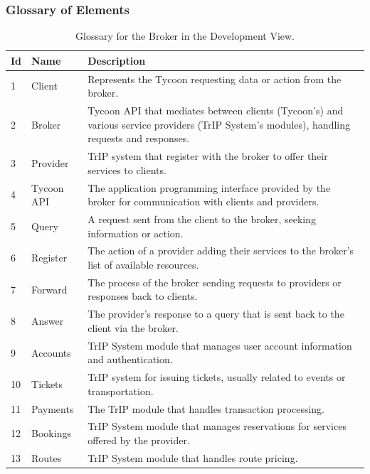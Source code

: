\subsubsection{Glossary of Elements}

\begin{table}[H]
    \centering
    \caption{Glossary for the Broker in the Development View.}
    \label{tab:broker_development_glossary}
    \begin{tabular}{@{}llp{10cm}@{}}
        \toprule
    \textbf{Id} & \textbf{Name} & \textbf{Description} \\
    \midrule
    1 & Client & Represents the Tycoon requesting data or action from the broker. \\
    2 & Broker & Tycoon API that mediates between clients (Tycoon's) and various service providers (TrIP System's modules), handling requests and responses. \\
    3 & Provider & TrIP system that register with the broker to offer their services to clients. \\
    4 & Tycoon API & The application programming interface provided by the broker for communication with clients and providers. \\
    5 & Query & A request sent from the client to the broker, seeking information or action. \\
    6 & Register & The action of a provider adding their services to the broker's list of available resources. \\
    7 & Forward & The process of the broker sending requests to providers or responses back to clients. \\
    8 & Answer & The provider's response to a query that is sent back to the client via the broker. \\
    9 & Accounts & TrIP System module that manages user account information and authentication. \\
    10 & Tickets & TrIP system for issuing tickets, usually related to events or transportation. \\
    11 & Payments & The TrIP module that handles transaction processing. \\
    12 & Bookings & TrIP System module that manages reservations for services offered by the provider. \\
    13 & Routes & TrIP System module that handles route pricing. \\
    \bottomrule
    \end{tabular}
\end{table}


